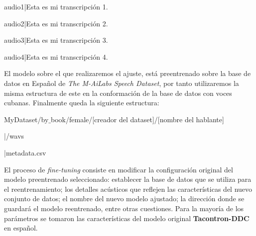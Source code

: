 \begin{center}
	audio1|Esta es mi transcripción 1.
	
	audio2|Esta es mi transcripción 2.
	
	audio3|Esta es mi transcripción 3.
	
	audio4|Esta es mi transcripción 4.
\end{center}

El modelo sobre el que realizaremos el ajuste, está preentrenado sobre la base de datos en Español de \textit{The M-AiLabs Speech Dataset}, por tanto utilizaremos la misma estructura de este en la conformación de la base de datos con voces cubanas. Finalmente queda la siguiente estructura:

\begin{flushleft}
	MyDataset/by$\_$book/female/[creador del dataset]/[nombre del hablante]
	
	|/wavs
	
	|metadata.csv
\end{flushleft}

El proceso de \textit{fine-tuning} consiste en modificar la configuración original del modelo preentrenado seleccionado: establecer la base de datos que se utiliza para el reentrenamiento; los detalles acústicos que reflejen las características del nuevo conjunto de datos; el nombre del nuevo modelo ajustado; la dirección donde se guardará el modelo reentrenado, entre otras cuestiones. Para la mayoría de los parámetros se tomaron las características del modelo original \textbf{Tacontron-DDC} en español.




	
	















	






